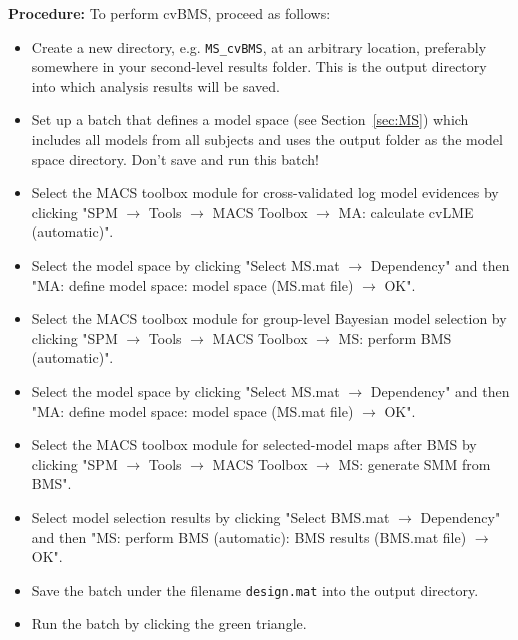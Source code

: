 \documentclass[a4paper,12pt]{article}
\newcommand{\ra}{$\rightarrow$ }
\begin{document}
\textbf{Procedure:} To perform cvBMS, proceed as follows:
\begin{itemize}
	
\item
Create a new directory, e.g. \texttt{MS\_cvBMS}, at an arbitrary location, preferably somewhere in your second-level results folder. This is the output directory into which analysis results will be saved.
	
\item
Set up a batch that defines a model space (see Section~\ref{sec:MS}) which includes all models from all subjects and uses the output folder as the model space directory. Don't save and run this batch!

\item
Select the MACS toolbox module for cross-validated log model evidences by clicking \linebreak[4] "SPM \ra Tools \ra MACS Toolbox \ra MA: calculate cvLME (automatic)".

\item
Select the model space by clicking "Select MS.mat \ra Dependency" and then \linebreak[4] "MA: define model space: model space (MS.mat file) \ra OK".

\item
Select the MACS toolbox module for group-level Bayesian model selection by clicking \linebreak[4] "SPM \ra Tools \ra MACS Toolbox \ra MS: perform BMS (automatic)".

\item
Select the model space by clicking "Select MS.mat \ra Dependency" and then \linebreak[4] "MA: define model space: model space (MS.mat file) \ra OK".

\item
Select the MACS toolbox module for selected-model maps after BMS by clicking \linebreak[4] "SPM \ra Tools \ra MACS Toolbox \ra MS: generate SMM from BMS".

\item
Select model selection results by clicking "Select BMS.mat \ra Dependency" and then \linebreak[4] "MS: perform BMS (automatic): BMS results (BMS.mat file) \ra OK".

\pagebreak
\item
Save the batch under the filename \texttt{design.mat} into the output directory.

\item
Run the batch by clicking the green triangle.
	
\end{itemize}
\end{document}
